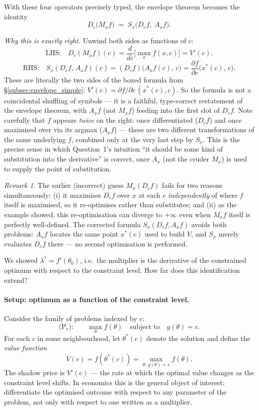 \documentclass[a4paper,oneside,12pt]{extarticle}
\theoremstyle{plain}
\theoremstyle{definition}
\theoremstyle{remark}
\newtheorem{remark}[proposition]{Remark}
\begin{document}
With these four operators precisely typed, the envelope theorem
becomes the identity
\[
  \boxed{\,D_c\big(M_x f\big) \;=\; S_x\big(D_c f,\; A_x f\big).\,}
\]

\emph{Why this is exactly right.}  Unwind both sides as functions
of $c$:
\[
  \text{LHS:}\quad D_c(M_xf)(c) = \frac{d}{dc}\Big[\max_x f(x,c)\Big]
  = V'(c).
\]
\[
  \text{RHS:}\quad S_x(D_cf,\,A_xf)(c)
  = (D_cf)\big(A_xf(c),\,c\big)
  = \frac{\partial f}{\partial c}\big(x^*(c),\,c\big).
\]
These are literally the two sides of the boxed formula from
\S\ref{subsec:envelope_simple}: $V'(c) = \partial f/\partial c\,
(x^*(c),c)$.  So the formula is not a coincidental shuffling of
symbols --- it is a faithful, type-correct restatement of the
envelope theorem, with $A_x f$ (not $M_x f$) feeding into the first
slot of $D_c f$.  Note carefully that $f$ appears \emph{twice} on
the right: once differentiated ($D_cf$) and once maximised over via
its argmax ($A_xf$) --- these are two different transformations of
the same underlying $f$, combined only at the very last step by
$S_x$.  This is the precise sense in which Question~1's intuition
``it should be some kind of substitution into the derivative'' is
correct, once $A_x$ (not the cruder $M_x$) is used to supply the
point of substitution.

\begin{remark}
The earlier (incorrect) guess $M_x(D_cf)$ fails for two reasons
simultaneously: (i) it maximises $D_cf$ over $x$ at each $c$
\emph{independently} of where $f$ itself is maximised, so it
re-optimises rather than substitutes; and (ii) as the example
showed, this re-optimisation can diverge to $+\infty$ even when
$M_xf$ itself is perfectly well-defined.  The corrected formula
$S_x(D_cf, A_xf)$ avoids both problems: $A_xf$ locates the same
point $x^*(c)$ used to build $V$, and $S_x$ merely evaluates
$D_cf$ there --- no second optimisation is performed.
\end{remark}


We showed $\lambda^* = f'(\theta_0)$, i.e.\ the multiplier is the
derivative of the constrained optimum with respect to the
constraint level.  How far does this identification extend?

\paragraph{Setup: optimum as a function of the constraint level.}
Consider the family of problems indexed by $c$:
\[
  \text{(P$_c$):} \qquad \max_\theta f(\theta)
  \quad \text{subject to} \quad g(\theta) = c.
\]
For each $c$ in some neighbourhood, let $\theta^*(c)$ denote the
solution and define the \emph{value function}
\[
  V(c) = f(\theta^*(c)) = \max_{\theta:\,g(\theta)=c} f(\theta).
\]
The shadow price is $V'(c)$ --- the rate at which the optimal value
changes as the constraint level shifts.  In economics this is the
general object of interest: differentiate the optimised outcome
with respect to any parameter of the problem, not only with
respect to one written as a multiplier.
\end{document}
